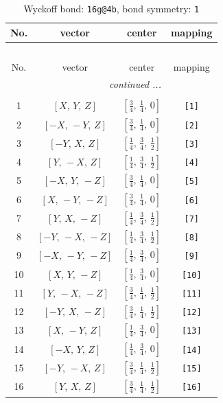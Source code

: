 \documentclass[fleqn,8pt]{jsarticle}
\begin{document}
\begin{longtable}{cccc}
\caption{Wyckoff bond: {\tt 16g@4b}, bond symmetry: {\tt 1}}
 \\
 \hline \hline
No. & vector & center & mapping \\ \hline \endfirsthead

\multicolumn{3}{l}{\tablename\ \thetable{}} \\
 \hline \hline
No. & vector & center & mapping \\ \hline \endhead

 \hline \hline
\multicolumn{3}{r}{\footnotesize\it continued ...} \\ \endfoot

 \hline \hline
\multicolumn{3}{r}{} \\ \endlastfoot

1 & $\left[ X,\, Y,\, Z \right]$ & $\left[ \frac{3}{4},\, \frac{1}{4},\, 0 \right]$ & {\tt [1]} \\ \hline
2 & $\left[ - X,\, - Y,\, Z \right]$ & $\left[ \frac{3}{4},\, \frac{1}{4},\, 0 \right]$ & {\tt [2]} \\ \hline
3 & $\left[ - Y,\, X,\, Z \right]$ & $\left[ \frac{1}{4},\, \frac{3}{4},\, \frac{1}{2} \right]$ & {\tt [3]} \\ \hline
4 & $\left[ Y,\, - X,\, Z \right]$ & $\left[ \frac{1}{4},\, \frac{3}{4},\, \frac{1}{2} \right]$ & {\tt [4]} \\ \hline
5 & $\left[ - X,\, Y,\, - Z \right]$ & $\left[ \frac{3}{4},\, \frac{1}{4},\, 0 \right]$ & {\tt [5]} \\ \hline
6 & $\left[ X,\, - Y,\, - Z \right]$ & $\left[ \frac{3}{4},\, \frac{1}{4},\, 0 \right]$ & {\tt [6]} \\ \hline
7 & $\left[ Y,\, X,\, - Z \right]$ & $\left[ \frac{1}{4},\, \frac{3}{4},\, \frac{1}{2} \right]$ & {\tt [7]} \\ \hline
8 & $\left[ - Y,\, - X,\, - Z \right]$ & $\left[ \frac{1}{4},\, \frac{3}{4},\, \frac{1}{2} \right]$ & {\tt [8]} \\ \hline
9 & $\left[ - X,\, - Y,\, - Z \right]$ & $\left[ \frac{1}{4},\, \frac{3}{4},\, 0 \right]$ & {\tt [9]} \\ \hline
10 & $\left[ X,\, Y,\, - Z \right]$ & $\left[ \frac{1}{4},\, \frac{3}{4},\, 0 \right]$ & {\tt [10]} \\ \hline
11 & $\left[ Y,\, - X,\, - Z \right]$ & $\left[ \frac{3}{4},\, \frac{1}{4},\, \frac{1}{2} \right]$ & {\tt [11]} \\ \hline
12 & $\left[ - Y,\, X,\, - Z \right]$ & $\left[ \frac{3}{4},\, \frac{1}{4},\, \frac{1}{2} \right]$ & {\tt [12]} \\ \hline
13 & $\left[ X,\, - Y,\, Z \right]$ & $\left[ \frac{1}{4},\, \frac{3}{4},\, 0 \right]$ & {\tt [13]} \\ \hline
14 & $\left[ - X,\, Y,\, Z \right]$ & $\left[ \frac{1}{4},\, \frac{3}{4},\, 0 \right]$ & {\tt [14]} \\ \hline
15 & $\left[ - Y,\, - X,\, Z \right]$ & $\left[ \frac{3}{4},\, \frac{1}{4},\, \frac{1}{2} \right]$ & {\tt [15]} \\ \hline
16 & $\left[ Y,\, X,\, Z \right]$ & $\left[ \frac{3}{4},\, \frac{1}{4},\, \frac{1}{2} \right]$ & {\tt [16]} \\
\end{longtable}
\end{document}
